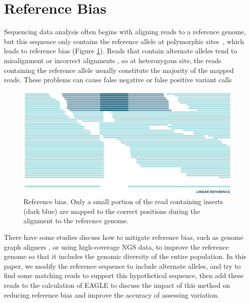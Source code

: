 \section{Reference Bias}
Sequencing data analysis often begins with aligning reads to a reference genome, but this sequence only contains the reference allele at polymorphic sites~\cite{martiniano2020removing}, which leads to reference bias (Figure \ref{reference_bias}).  Reads that contain alternate alleles tend to misalignment or incorrect alignments \cite{chen2021reference}, so at heterozygous site, the reads containing the reference allele usually constitute the majority of the mapped reads.  These problems can cause false negative or false positive variant calls~\cite{gunther2019presence}

\begin{figure}[H]
\includegraphics[width=1\columnwidth]{body/image/reference_bias.png}\vspace*{-1em}
\caption[Reference bias]{Reference bias. Only a small portion of the read containing inserts (dark blue) are mapped to the correct positions during the alignment to the reference genome.}
\label{reference_bias}
\end{figure}
 

There have some studies discuss how to mitigate reference bias, such as genome graph aligners \cite{garrison2018variation,li2020design}, or using high-coverage NGS data, to improve the reference genome so that it includes the genomic diversity of the entire population.
In this paper, we modify the reference sequence to include alternate alleles, and try to find some matching reads to support this hypothetical sequence, then add these reads to the calculation of EAGLE to discuss the impact of this method on reducing reference bias and improve the accuracy of assessing variation.
